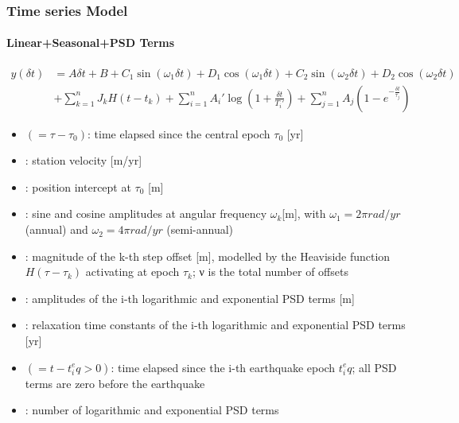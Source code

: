 \begin{frame}
  \frametitle{Time series Model}
  \framesubtitle{Linear+Seasonal+PSD Terms}
  \label{}
\begin{align*}
    y(\delta t) &= A \delta t + B + C_1 \sin(\omega_1 \delta t) + D_1 \cos(\omega_1 \delta t)
    + C_2 \sin(\omega_2 \delta t) + D_2 \cos(\omega_2 \delta t) \\
   & + \sum_{k=1}^{n} J_k H(t - t_k)
    + \sum_{i=1}^{n} A_i' \log\!\left(1 + \frac{\delta t}{T_i'}\right)
    + \sum_{j=1}^{n} A_j \left(1 - e^{-\frac{\delta t}{\tau_j}}\right)
\end{align*}
\begin{scriptsize}

\begin{itemize}
    \item[$\delta \tau$] $(= \tau - \tau_0)$: time elapsed since the central epoch $\tau_0$ [yr] 
    \item[$A$]:	station velocity [m/yr] 
    \item[$B$]:	position intercept at $\tau_0$ [m] 
    \item[$C_k,	D_k$]: sine and cosine amplitudes at angular frequency $\omega_k$[m], with $\omega_1 = 2π rad/yr$ (annual) and $\omega_2= 4π rad/yr$ (semi-annual) 
    \item[$J_k$]: magnitude of the k-th step offset [m], modelled by the Heaviside function $H(\tau − \tau_k)$ activating at epoch $\tau_k$;	ν is the total number of offsets 
    \item[$A_i^l, 	A_i^e$]: amplitudes of the i-th logarithmic and exponential PSD terms [m]
    \item[$\tau_I^l, \tau_i^e$]: relaxation time constants of the i-th logarithmic and exponential PSD terms [yr] 
    \item[$\Delta t_i$] $( = t − t_i^e q > 0)$: time elapsed since the i-th earthquake epoch $t_i^e q$; all PSD terms are zero before the earthquake 
    \item[$nₗ, 	nₑ$]: number of logarithmic and exponential PSD terms 
\end{itemize}
\begin{flushright}
\citep{itrf2020}
\end{flushright}
\end{scriptsize}
\end{frame}
\note{}

